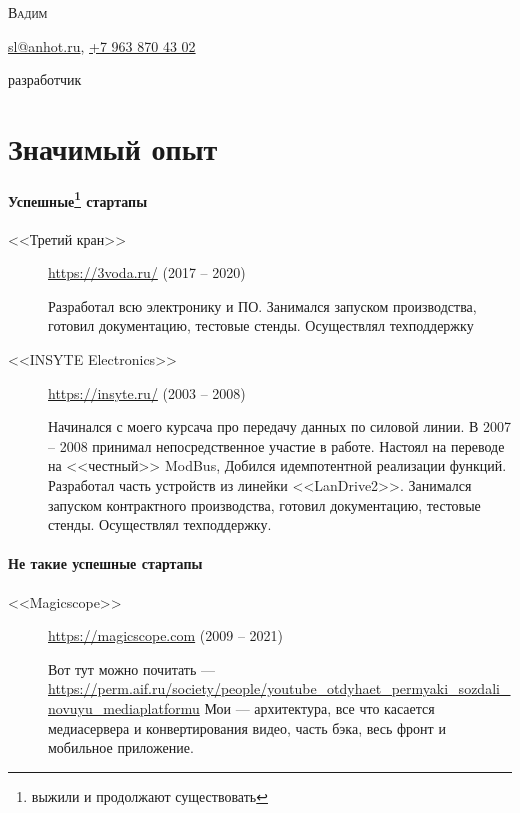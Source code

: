 \documentclass [a4paper,10pt]{article}
\begin{document}
\begin{center}
{\scshape\LARGE Вадим \par}
\Letter\hspace{6pt}\href{mailto:sl@anhot.ru}{sl@anhot.ru},
\Mobilefone\hspace{6pt}\href{tel:+79638704302}{+7 963 870 43 02}

разработчик
\end{center}
\section*{Значимый опыт}
\paragraph{Успешные\protect\footnote{выжили и продолжают существовать} стартапы}
\begin{description}
\item[<<Третий кран>>] \url{https://3voda.ru/} (2017 -- 2020)

Разработал всю электронику и ПО. Занимался запуском производства, готовил документацию, тестовые стенды. Осуществлял техподдержку

\item[<<INSYTE Electronics>>] \url{https://insyte.ru/} (2003 -- 2008)

Начинался с моего курсача про передачу данных по силовой линии. В 2007 -- 2008 принимал непосредственное участие в работе.
Настоял на переводе на <<честный>> ModBus, Добился идемпотентной реализации функций. Разработал часть устройств из линейки <<LanDrive2>>.
Занимался запуском контрактного производства, готовил документацию, тестовые стенды. Осуществлял техподдержку.
\end{description}

\paragraph{Не такие успешные стартапы}
\begin{description}
\item[<<Magicscope>>] \url{https://magicscope.com} (2009 -- 2021)

Вот тут можно почитать --- \url{https://perm.aif.ru/society/people/youtube_otdyhaet_permyaki_sozdali_novuyu_mediaplatformu}
Мои --- архитектура, все что касается медиасервера и конвертирования видео, часть бэка, весь фронт и мобильное приложение.
\end{description}
\end{document}
